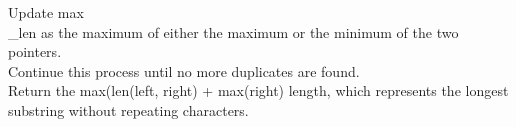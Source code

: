 \documentclass[preview]{standalone}
\begin{document}
Update max\\_len as the maximum of either the maximum or the minimum of the two pointers.\\Continue this process until no more duplicates are found.\\Return the max(len(left, right) + max(right) length, which represents the longest substring without repeating characters.\\
\end{document}
